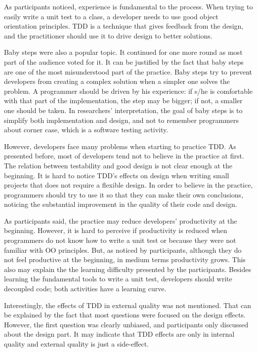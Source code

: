 As participants noticed, experience is fundamental to the process. When
trying to easily write a unit test to a class, a developer needs to use good
object orientation principles. TDD is a technique that gives feedback from the
design, and the practitioner should use it to drive design to better solutions.

Baby steps were also a popular topic. It continued for one more
round as most part of the audience voted for it.
It can be justified by the fact that baby steps are one of the most
misunderstood part of the practice. Baby steps try to prevent developers from
creating a complex solution when a simpler one solves the problem. A programmer
should be driven by his experience: if s/he is comfortable with that part of the
implementation, the step may be bigger; if not, a smaller one should be taken.
In researchers' interpretation, the goal of baby steps is to simplify both
implementation and design, and not to remember programmers about corner case,
which is a software testing activity.

However, developers face many problems when starting to practice TDD. As
presented before, most of developers tend not to believe in the practice at
first. The relation between testability and good design is not clear enough at the
beginning.
It is hard to notice TDD's effects on design when writing small projects that
does not require a flexible design. In order to believe in the practice,
programmers should try to use it so that they can make their own conclusions, 
noticing the substantial improvement in the quality of their code and design.

As participants said, the practice may reduce developers' productivity at the
beginning. However, it is hard to perceive if productivity is reduced when
programmers do not know how to write a unit test or because they were not familiar with OO
principles. But, as noticed by participants, although they do not feel
productive at the beginning, in medium terms productivity grows. 
This also may explain the the learning difficulty presented by the participants.
Besides learning the fundamental tools to write a unit test, developers should
write decoupled code; both activities have a learning curve.

Interestingly, the effects of TDD in external quality was not mentioned. That
can be explained by the fact that most questions were focused on the design
effects. However, the first question was clearly unbiased, and participants only
discussed about the design part. It may indicate that TDD effects are only in
internal quality and external quality is just a side-effect.

